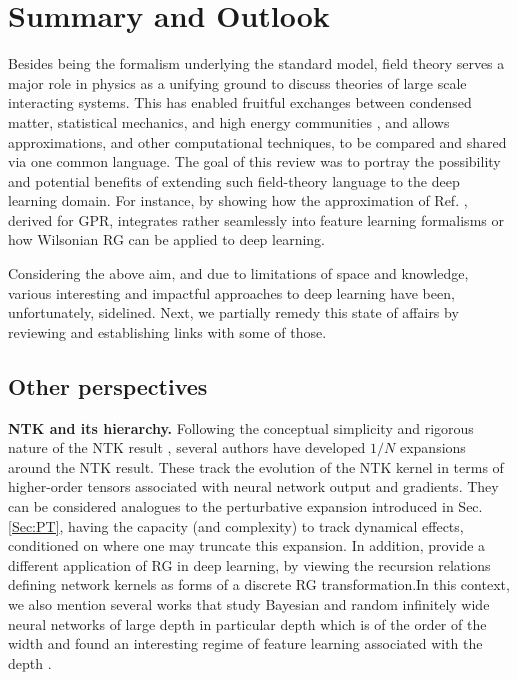 \chapter{Summary and Outlook}
Besides being the formalism underlying the standard model, field theory serves a major role in physics as a unifying ground to discuss theories of large scale interacting systems. This has enabled fruitful exchanges between condensed matter, statistical mechanics, and high energy communities \citep{Fradkin_2024}, and allows approximations, and other computational techniques, to be compared and shared via one common language. The goal of this review was to portray the possibility and potential benefits of extending such field-theory language to the deep learning domain. For instance, by showing how the approximation of Ref. \cite{Canatar2021}, derived for GPR, integrates rather seamlessly into feature learning formalisms or how Wilsonian RG can be applied to deep learning. 

Considering the above aim, and due to limitations of space and knowledge, various interesting and impactful approaches to deep learning have been, unfortunately, sidelined. Next, we partially remedy this state of affairs by reviewing and establishing links with some of those. 

\section{Other perspectives}

{\bf NTK and its hierarchy.} Following the conceptual simplicity and rigorous nature of the NTK result \cite{Jacot2018}, several authors have developed $1/N$ expansions \cite{roberts2021principles,huang2019dynamicsdeepneuralnetworks,dyer2019asymptotics} around the NTK result. These track the evolution of the NTK kernel in terms of higher-order tensors associated with neural network output and gradients. They can be considered analogues to the perturbative expansion introduced in Sec. \ref{Sec:PT}, having the capacity (and complexity) to track dynamical effects, conditioned on where one may truncate this expansion. In addition, \cite{roberts2021principles} provide a different application of RG in deep learning, by viewing the recursion relations defining network kernels as forms of a discrete RG transformation.In this context, we also mention several works that study Bayesian and random infinitely wide neural networks of large depth in particular depth which is of the order of the width and found an interesting regime of feature learning associated with the depth \cite{Hanin2023,hanin2024bayesian}.

